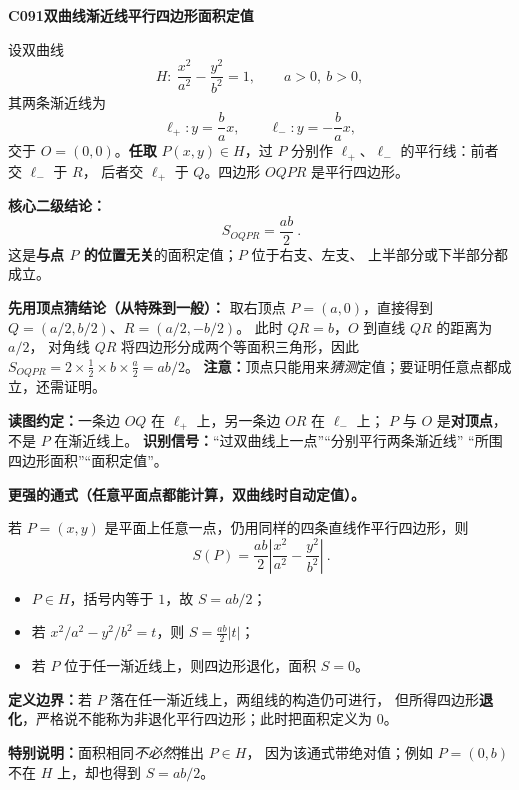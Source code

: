 \begin{statementbox}
\textbf{C091\quad 双曲线渐近线平行四边形面积定值}

设双曲线
\[
H:\ \frac{x^2}{a^2}-\frac{y^2}{b^2}=1,\qquad a>0,\ b>0,
\]
其两条渐近线为
\[
\ell_+:y=\frac ba x,\qquad \ell_-:y=-\frac ba x,
\]
交于 $O=(0,0)$。\textbf{任取} $P(x,y)\in H$，过 $P$ 分别作
$\ell_+$、$\ell_-$ 的平行线：前者交 $\ell_-$ 于 $R$，
后者交 $\ell_+$ 于 $Q$。四边形 $OQPR$ 是平行四边形。

\textbf{核心二级结论：}
\[
\boxed{\ S_{OQPR}=\frac{ab}{2}\ }.
\]
这是\textbf{与点 $P$ 的位置无关}的面积定值；$P$ 位于右支、左支、
上半部分或下半部分都成立。

\begin{center}

\end{center}

\textbf{先用顶点猜结论（从特殊到一般）：}
取右顶点 $P=(a,0)$，直接得到
$Q=(a/2,b/2)$、$R=(a/2,-b/2)$。
此时 $QR=b$，$O$ 到直线 $QR$ 的距离为 $a/2$，
对角线 $QR$ 将四边形分成两个等面积三角形，因此
$S_{OQPR}=2\times\tfrac12\times b\times\tfrac a2=ab/2$。
\textbf{注意：}顶点只能用来\emph{猜测}定值；要证明任意点都成立，还需证明。

\textbf{读图约定：}一条边 $OQ$ 在 $\ell_+$ 上，另一条边 $OR$ 在 $\ell_-$ 上；
$P$ 与 $O$ 是\textbf{对顶点}，不是 $P$ 在渐近线上。
\textbf{识别信号：}“过双曲线上一点”“分别平行两条渐近线”
“所围四边形面积”“面积定值”。
\end{statementbox}

\clearpage
\begin{statementbox}
\textbf{更强的通式（任意平面点都能计算，双曲线时自动定值）。}

若 $P=(x,y)$ 是平面上任意一点，仍用同样的四条直线作平行四边形，则
\[
\boxed{\ S(P)=\frac{ab}{2}\left|\frac{x^2}{a^2}-\frac{y^2}{b^2}\right|\ }.
\]
\begin{itemize}
\item $P\in H$，括号内等于 $1$，故 $S=ab/2$；
\item 若 $x^2/a^2-y^2/b^2=t$，则 $S=\frac{ab}{2}|t|$；
\item 若 $P$ 位于任一渐近线上，则四边形退化，面积 $S=0$。
\end{itemize}
\textbf{定义边界：}若 $P$ 落在任一渐近线上，两组线的构造仍可进行，
但所得四边形\textbf{退化}，严格说不能称为非退化平行四边形；此时把面积定义为 $0$。

\textbf{特别说明：}面积相同\emph{不必然}推出 $P\in H$，
因为该通式带绝对值；例如 $P=(0,b)$ 不在 $H$ 上，却也得到 $S=ab/2$。
\end{statementbox}
